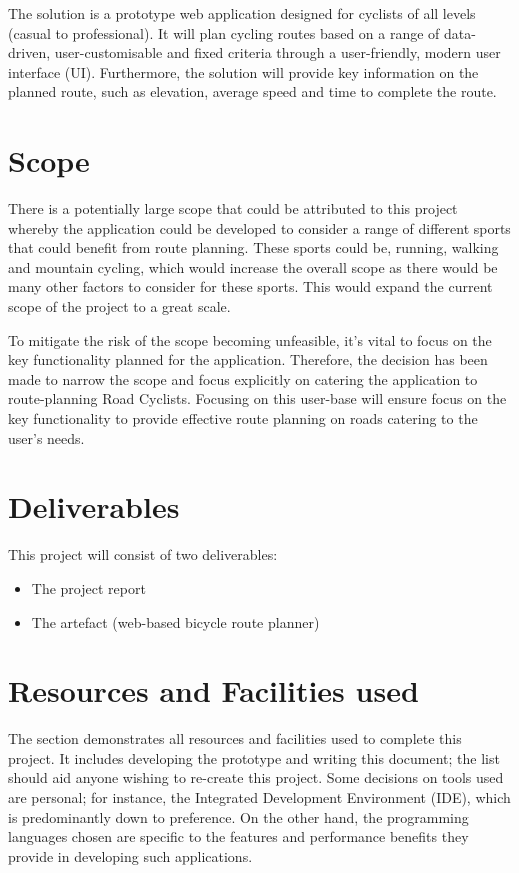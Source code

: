 The solution is a prototype web application designed for cyclists of all levels (casual to professional). It will plan cycling routes based on a range of data-driven, user-customisable and fixed criteria through a user-friendly, modern user interface (UI). Furthermore, the solution will provide key information on the planned route, such as elevation, average speed and time to complete the route.

\section{Scope}
\label{intro:scope}

There is a potentially large scope that could be attributed to this project whereby the application could be developed to consider a range of different sports that could benefit from route planning. These sports could be, running, walking and mountain cycling, which would increase the overall scope as there would be many other factors to consider for these sports. This would expand the current scope of the project to a great scale.

To mitigate the risk of the scope becoming unfeasible, it's vital to focus on the key functionality planned for the application. Therefore, the decision has been made to narrow the scope and focus explicitly on catering the application to route-planning Road Cyclists. Focusing on this user-base will ensure focus on the key functionality to provide effective route planning on roads catering to the user's needs.

\section{Deliverables}
\label{intro:deliverables}

This project will consist of two deliverables:
\begin{itemize}
    \item The project report
    \item The artefact (web-based bicycle route planner)
\end{itemize}

\section{Resources and Facilities used}
\label{intro:resourcesandfacilities}

The section demonstrates all resources and facilities used to complete this project. It includes developing the prototype and writing this document; the list should aid anyone wishing to re-create this project. Some decisions on tools used are personal; for instance, the Integrated Development Environment (IDE), which is predominantly down to preference. On the other hand, the programming languages chosen are specific to the features and performance benefits they provide in developing such applications.

